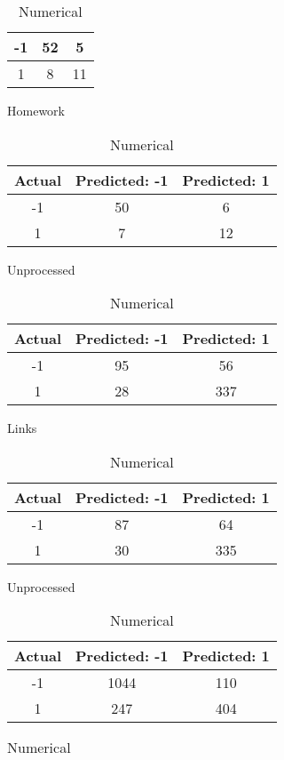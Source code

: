 \begin{table}[!htb]
\begin{minipage}{.5\linewidth}
\begin{tabular}{| c | c | c |}
			-1			& 52			& 5			\\ \hline
			1			& 8				& 11		\\ \hline
		\end{tabular}
	\end{minipage} 	%
	\begin{minipage}{.5\linewidth}
		\caption{Homework}
		\centering
		\begin{tabular}{| c | c | c |}
			\hline
			Actual 		& Predicted: -1	& Predicted: 1	\\ \hline
			-1			& 50			& 6 			\\ \hline
			1			& 7 			& 12			\\ \hline
		\end{tabular}
	\end{minipage}
	\begin{minipage}{.5\linewidth}
		\caption{Unprocessed}
		\centering
		\begin{tabular}{| c | c | c |}
			\hline
			Actual 		& Predicted: -1	& Predicted: 1	\\ \hline
			-1			& 95			& 56			\\ \hline
			1			& 28			& 337			\\ \hline
		\end{tabular}
	\end{minipage}%
	\begin{minipage}{.5\linewidth}
		\centering
		\caption{Links}
		\begin{tabular}{| c | c | c |}
			\hline
			Actual 		& Predicted: -1	& Predicted: 1	\\ \hline
			-1			& 87			& 64			\\ \hline
			1			& 30			& 335			\\ \hline
		\end{tabular}
	\end{minipage} 
	\begin{minipage}{.5\linewidth}
		\caption{Unprocessed}
		\centering
		\begin{tabular}{| c | c | c |}
			\hline
			Actual 		& Predicted: -1	& Predicted: 1	\\ \hline
			-1			& 1044			& 110			\\ \hline
			1			& 247			& 404			\\ \hline
		\end{tabular}
	\end{minipage}%
	\begin{minipage}{.5\linewidth}
		\centering
		\caption{Numerical}
		\begin{tabular}{| c | c | c |}
			\hline

\end{tabular}
\end{minipage}
\end{table}
